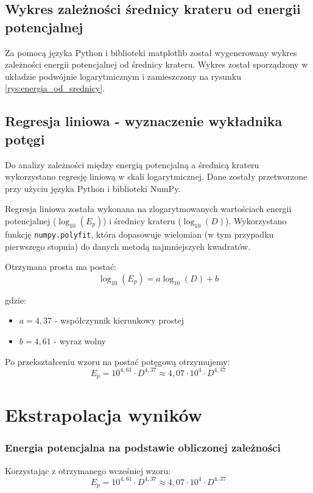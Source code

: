 \documentclass[a4paper,12pt]{article}
\begin{document}
\subsection{Wykres zależności średnicy krateru od energii potencjalnej}

Za pomocą języka Python i biblioteki matplotlib został wygenerowany wykres zależności energii potencjalnej od średnicy krateru. Wykres został sporządzony w układzie podwójnie logarytmicznym i zamieszczony na rysunku \ref{rys:energia_od_srednicy}.

\subsection{Regresja liniowa - wyznaczenie wykładnika potęgi}

Do analizy zależności między energią potencjalną a średnicą krateru wykorzystano regresję liniową w skali logarytmicznej. Dane zostały przetworzone przy użyciu języka Python i biblioteki NumPy.

Regresja liniowa została wykonana na zlogarytmowanych wartościach energii potencjalnej ($\log_{10}(E_p)$) i średnicy krateru ($\log_{10}(D)$). Wykorzystano funkcję \texttt{numpy.polyfit}, która dopasowuje wielomian (w tym przypadku pierwszego stopnia) do danych metodą najmniejszych kwadratów.


Otrzymana prosta ma postać:
\[ \log_{10}(E_p) = a\log_{10}(D) + b \]

gdzie:
\begin{itemize}
    \item $a = 4,37$ - współczynnik kierunkowy prostej
    \item $b = 4,61$ - wyraz wolny
\end{itemize}

Po przekształceniu wzoru na postać potęgową otrzymujemy:
\[ E_p = 10^{4,61} \cdot D^{4,37} \approx 4,07 \cdot 10^4 \cdot D^{4,37} \]
\section{Ekstrapolacja wyników}

\subsubsection{Energia potencjalna na podstawie obliczonej zależności}

Korzystając z otrzymanego wcześniej wzoru:
\[
E_p = 10^{4,61} \cdot D^{4,37} \approx 4,07 \cdot 10^4 \cdot D^{4,37}
\]
\end{document}
